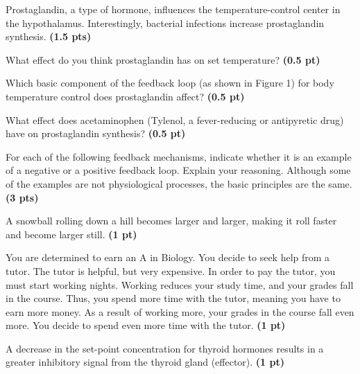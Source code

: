 \documentclass[12pt,a4paper]{article}
\begin{document}
\begin{enumerate}[font=\bfseries, wide]
    {\color{under}\item Prostaglandin, a type of hormone, influences the temperature-control center in the hypothalamus. Interestingly, bacterial infections increase prostaglandin synthesis. \textbf{(1.5 pts)}}
    \begin{enumerate}[font=\bfseries, wide]
        {\color{under}\item What effect do you think prostaglandin has on set temperature? \textbf{(0.5 pt)}}
        {\color{under}\item Which basic component of the feedback loop (as shown in Figure 1) for body temperature control does prostaglandin affect? \textbf{(0.5 pt)}}
        {\color{under}\item What effect does acetaminophen (Tylenol, a fever-reducing or antipyretic drug) have on prostaglandin synthesis? \textbf{(0.5 pt)}}
    \end{enumerate}
    {\color{under}\item For each of the following feedback mechanisms, indicate whether it is an example of a negative or a positive feedback loop. Explain your reasoning. Although some of the examples are not physiological processes, the basic principles are the same. \textbf{(3 pts)}}
    \begin{enumerate}[font=\bfseries, wide]
        {\color{under}\item A snowball rolling down a hill becomes larger and larger, making it roll faster and become larger still. \textbf{(1 pt)}}
        {\color{under}\item  You are determined to earn an A in Biology. You decide to seek help from a tutor. The tutor is helpful, but very expensive. In order to pay the tutor, you must start working nights. Working reduces your study time, and your grades fall in the course. Thus, you spend more time with the tutor, meaning you have to earn more money. As a result of working more, your grades in the course fall even more. You decide to spend even more time with the tutor. \textbf{(1 pt)}}
        {\color{under}\item A decrease in the set-point concentration for thyroid hormones results in a greater inhibitory signal from the thyroid gland (effector). \textbf{(1 pt)}}
    \end{enumerate}
\end{enumerate}
\end{document}

